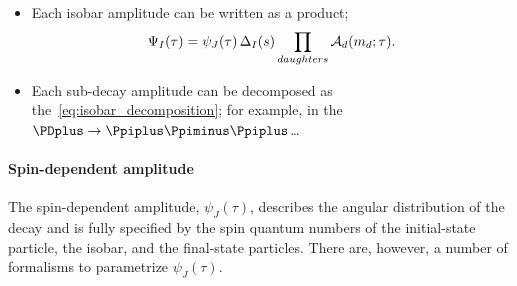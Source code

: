     \begin{itemize}
        \item Each isobar amplitude can be written as a product;
            \begin{equation}
                \Psi_I(\tau) = \psi_J(\tau)\,\Delta_I(s)\prod_{daughters} \mathcal{A}_d(m_d; \tau).
            \end{equation}
        \item Each sub-decay amplitude can be decomposed as the~\eqref{eq:isobar_decomposition}; for example, in the $\PDplus\to\Ppiplus\Ppiminus\Ppiplus$\dots
    \end{itemize}

    \paragraph{Spin-dependent amplitude}
    The spin-dependent amplitude, $\psi_J(\tau)$, describes the angular distribution of the decay and is fully specified by the spin quantum numbers of the initial-state particle, the isobar, and the final-state particles.
    There are, however, a number of formalisms to parametrize $\psi_J(\tau)$.
    

